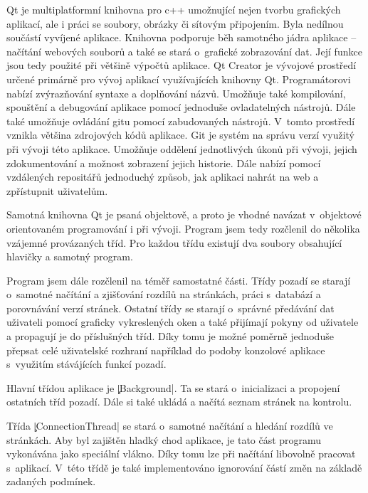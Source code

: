 
Qt je multiplatformní knihovna pro c++ umožnující nejen tvorbu grafických aplikací, ale i práci se soubory, obrázky či sítovým připojením.
Byla nedílnou součástí vyvíjené aplikace.
Knihovna podporuje běh samotného jádra aplikace -- načítání webových souborů a také se stará o~grafické zobrazování dat.
Její funkce jsou tedy použité při většině výpočtů aplikace.
Qt Creator je vývojové prostředí určené primárně pro vývoj aplikací využívajících knihovny Qt.
Programátorovi nabízí zvýrazňování syntaxe a doplňování názvů.
Umožňuje také kompilování, spouštění a debugování aplikace pomocí jednoduše ovladatelných nástrojů.
Dále také umožňuje ovládání gitu pomocí zabudovaných nástrojů.
V~tomto prostředí vznikla většina zdrojových kódů aplikace.
Git je systém na správu verzí využitý při vývoji této aplikace.
Umožňuje oddělení jednotlivých úkonů při vývoji, jejich zdokumentování a možnost zobrazení jejich historie.
Dále nabízí pomocí vzdálených repositářů jednoduchý způsob, jak aplikaci nahrát na web a zpřístupnit uživatelům.

	Samotná knihovna Qt je psaná objektově, a proto je vhodné navázat v~objektové orientovaném programování i při vývoji.
	Program jsem tedy rozčlenil do několika vzájemné provázaných tříd.
	Pro každou třídu existují dva soubory obsahující hlavičky a samotný program.

	Program jsem dále rozčlenil na téměř samostatné části.
	Třídy pozadí se starají o~samotné načítání a zjišťování rozdílů na stránkách, práci s~databází a porovnávání verzí stránek.
	Ostatní třídy se starají o~správné předávání dat uživateli pomocí graficky vykreslených oken a také přijímají pokyny od uživatele a propagují je do příslušných tříd.
	Díky tomu je možné poměrně jednoduše přepsat celé uživatelské rozhraní například do podoby konzolové aplikace s~využitím stávájících funkcí pozadí.


Hlavní třídou aplikace je \c|Background|. Ta se stará o~inicializaci a propojení ostatních tříd pozadí.
Dále si také ukládá a načítá seznam stránek na kontrolu.

Třída \c|ConnectionThread| se stará o~samotné načítání a hledání rozdílů ve stránkách. Aby byl zajištěn hladký chod aplikace, je tato část programu vykonávána jako speciální vlákno. %
Díky tomu lze při načítání libovolně pracovat s~aplikací.
V~této třídě je také implementováno ignorování částí změn na základě zadaných podmínek.

